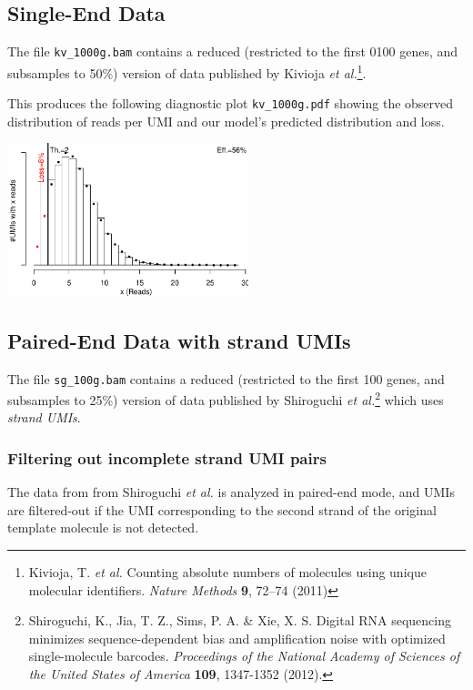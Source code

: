 \documentclass[10pt]{article}
\begin{document}
\subsection{Single-End Data}

The file \texttt{kv\_1000g.bam} contains a reduced (restricted to the first 0100 genes, and subsamples to 50\%) version of data published by Kivioja \textit{et al.}\footnote{Kivioja, T. \textit{et al.} Counting absolute numbers of molecules using unique molecular identifiers. \textit{Nature Methods} \textbf{9}, 72–74 (2011)}.


This produces the following diagnostic plot \texttt{kv\_1000g.pdf} showing the observed distribution of reads per UMI and our model's predicted distribution and loss.

{\centering \includegraphics[width=7cm]{../examples/kv_1000g.pdf}\\}

\subsection{Paired-End Data with strand UMIs}

The file \texttt{sg\_100g.bam} contains a reduced (restricted to the first 100 genes, and subsamples to 25\%) version of data published by Shiroguchi \textit{et al.}\footnote{Shiroguchi, K., Jia, T. Z., Sims, P. A. \& Xie, X. S. Digital RNA sequencing minimizes sequence-dependent bias and amplification noise with optimized single-molecule barcodes. \textit{Proceedings of the National Academy of Sciences of the United States of America} \textbf{109}, 1347-1352 (2012).} which uses \emph{strand UMIs}.

\subsubsection*{Filtering out incomplete strand UMI pairs}

The data from from Shiroguchi \textit{et al.} is analyzed in paired-end mode, and UMIs are filtered-out if the UMI corresponding to the second strand of the original template molecule is not detected.
\end{document}
